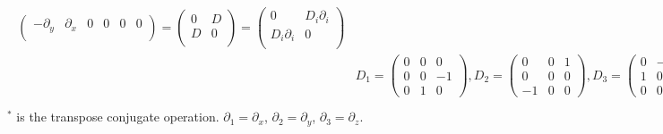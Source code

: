 \documentclass[pdftex,a4paper,parskip,listof=totoc,bibliography=totoc,onehalfspacing,12pt]{scrreprt}
\begin{document}
\begin{equation}
\begin{align}
\begin{split}
\begin{pmatrix}
   -\partial_{y}	& \partial_{x} 	& 0         	   & 0	       & 0         & 0        \\
 \end{pmatrix} = 
 \begin{pmatrix}
   0          & D         \\
   D          & 0         \\
 \end{pmatrix} = 
 \begin{pmatrix}
   0          & D_i \partial_{i}         \\
   D_i \partial_{i}          & 0         \\
 \end{pmatrix} \\
& D_1= 
 \begin{pmatrix}
   0          & 0        & 0 \\
   0          & 0        & -1 \\
   0          & 1        & 0 
 \end{pmatrix},  D_2= 
 \begin{pmatrix}
   0          & 0        & 1 \\
   0          & 0        & 0 \\
  -1          & 0        & 0 
 \end{pmatrix},
  D_3= 
 \begin{pmatrix}
   0          & -1        & 0 \\
   1          & 0        & 0 \\
   0          & 0        & 0 
 \end{pmatrix} ,
 D_i^{*} = D_i^T = -D_i\\
\end{split}
\end{align}
\end{equation}
$^{*}$ is the transpose conjugate operation. $\partial_{1} = \partial_{x}$, $\partial_{2} = \partial_{y}$, $\partial_{3} = \partial_{z}$.\\
\end{document}
